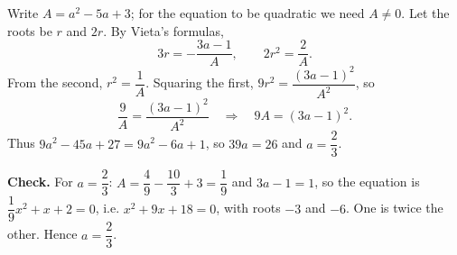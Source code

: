 Write $A=a^2-5a+3$; for the equation to be quadratic we need $A\ne0$. Let the roots be $r$ and $2r$. By Vieta's formulas,
\[
3r=-\dfrac{3a-1}{A},\qquad 2r^2=\dfrac{2}{A}.
\]
From the second, $r^2=\dfrac{1}{A}$. Squaring the first, $9r^2=\dfrac{(3a-1)^2}{A^2}$, so
\[
\dfrac{9}{A}=\dfrac{(3a-1)^2}{A^2}\quad\Longrightarrow\quad 9A=(3a-1)^2 .
\]
Thus $9a^2-45a+27=9a^2-6a+1$, so $39a=26$ and $a=\dfrac{2}{3}$.

\textbf{Check.} For $a=\dfrac{2}{3}$: $A=\dfrac{4}{9}-\dfrac{10}{3}+3=\dfrac{1}{9}$ and $3a-1=1$, so the equation is $\dfrac{1}{9}x^2+x+2=0$, i.e. $x^2+9x+18=0$, with roots $-3$ and $-6$. One is twice the other. Hence $a=\boxed{\dfrac{2}{3}}$.
